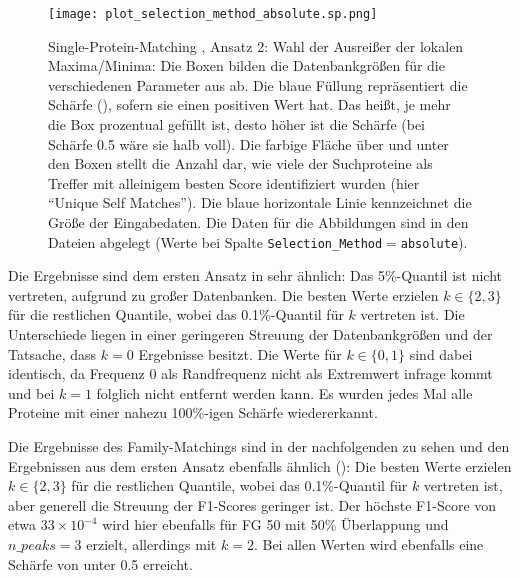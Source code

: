         \begin{figure}[H]
            \texttt{[image: plot\_selection\_method\_absolute.sp.png]}
            \caption[Single-Protein-Matching , Ansatz 2: Wahl der Ausreißer der lokalen Maxima/Minima]{Single-Protein-Matching , Ansatz 2: Wahl der Ausreißer der lokalen Maxima/Minima: Die Boxen bilden die Datenbankgrößen für die verschiedenen Parameter aus  ab. Die blaue Füllung repräsentiert die Schärfe (), sofern sie einen positiven Wert hat. Das heißt, je mehr die Box prozentual gefüllt ist, desto höher ist die Schärfe (bei Schärfe 0.5 wäre sie halb voll). Die farbige Fläche über und unter den Boxen stellt die Anzahl dar, wie viele der Suchproteine als Treffer mit alleinigem besten Score identifiziert wurden (hier ``Unique Self Matches''). Die blaue horizontale Linie kennzeichnet die Größe der Eingabedaten. Die Daten für die Abbildungen sind in den Dateien  abgelegt (Werte bei Spalte \texttt{Selection\_Method}$=$\texttt{absolute}).}
            \label{fig:selection_method.absolute.sp}
        \end{figure}

        Die Ergebnisse sind dem ersten Ansatz in  sehr ähnlich: Das 5\%-Quantil ist nicht vertreten, aufgrund zu großer Datenbanken. Die besten Werte erzielen $k \in \{2, 3\}$ für die restlichen Quantile, wobei das 0.1\%-Quantil für $k$ vertreten ist. Die Unterschiede liegen in einer geringeren Streuung der Datenbankgrößen und der Tatsache, dass $k=0$ Ergebnisse besitzt. Die Werte für $k \in \{0, 1\}$ sind dabei identisch, da Frequenz 0 als Randfrequenz nicht als Extremwert infrage kommt und bei $k=1$ folglich nicht entfernt werden kann. Es wurden jedes Mal alle Proteine mit einer nahezu 100\%-igen Schärfe wiedererkannt.

        Die Ergebnisse des Family-Matchings sind in der nachfolgenden  zu sehen und den Ergebnissen aus dem ersten Ansatz ebenfalls ähnlich (): Die besten Werte erzielen $k \in \{2, 3\}$ für die restlichen Quantile, wobei das 0.1\%-Quantil für $k$ vertreten ist, aber generell die Streuung der F1-Scores geringer ist. Der höchste F1-Score von etwa $33\times 10^{-4}$ wird hier ebenfalls für \ac{FG} 50 mit 50\% Überlappung und $n\_peaks=3$ erzielt, allerdings mit $k=2$. Bei allen Werten wird ebenfalls eine Schärfe von unter 0.5 erreicht.

